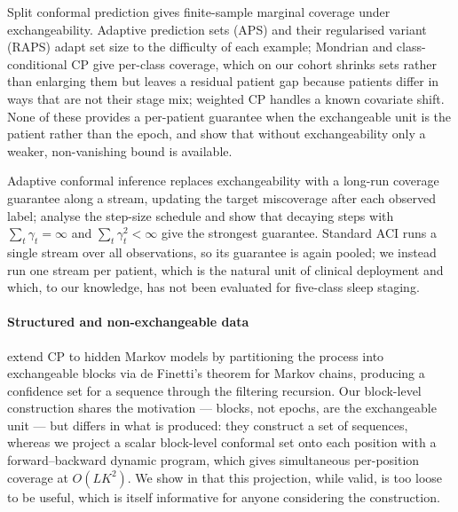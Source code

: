Split conformal prediction \citep{vovk2005,lei2018,angelopoulos2023gentle}
gives finite-sample marginal coverage under exchangeability. Adaptive
prediction sets (APS) and their regularised variant (RAPS)
\citep{romano2020,angelopoulos2021raps} adapt set size to the difficulty of
each example; Mondrian and class-conditional CP \citep{vovk2012} give
per-class coverage, which on our cohort shrinks sets rather than enlarging
them but leaves a residual patient gap because patients differ in ways that
are not their stage mix; weighted CP
\citep{tibshirani2019} handles a known covariate shift. None of these
provides a per-patient guarantee when the exchangeable unit is the patient
rather than the epoch, and \citet{barber2023} show that without
exchangeability only a weaker, non-vanishing bound is available.

Adaptive conformal inference \citep{gibbs2021} replaces exchangeability with a
long-run coverage guarantee along a stream, updating the target miscoverage
after each observed label; \citet{angelopoulos2024} analyse the step-size schedule
and show that decaying steps with $\sum_t\gamma_t=\infty$ and
$\sum_t\gamma_t^2<\infty$ give the strongest guarantee. Standard ACI runs a
single stream over all observations, so its guarantee is again pooled; we
instead run one stream per patient, which is the natural unit of clinical
deployment and which, to our knowledge, has not been evaluated for
five-class sleep staging.

\paragraph{Structured and non-exchangeable data}
\citet{nettasinghe2023} extend CP to hidden Markov models by partitioning the
process into exchangeable blocks via de Finetti's theorem for Markov chains,
producing a confidence set for a sequence through the filtering recursion.
Our block-level construction shares the motivation --- blocks, not epochs,
are the exchangeable unit --- but differs in what is produced: they construct
a set of sequences, whereas we project a scalar block-level conformal set onto
each position with a forward--backward dynamic program, which gives
simultaneous per-position coverage at $O(LK^2)$. We show in
 that this projection, while valid, is too loose
to be useful, which is itself informative for anyone considering the
construction.

